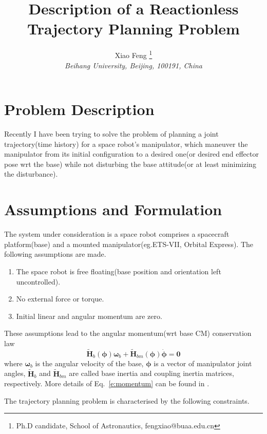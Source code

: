 \documentclass{article}
\title{Description of a Reactionless Trajectory Planning Problem}
\author{
	Xiao Feng
	\thanks{Ph.D candidate, School of Astronautics, fengxiao@buaa.edu.cn}\\
	{\normalsize\itshape
		Beihang University, Beijing, 100191, China}\\
}
\begin{document}
	\maketitle

\section{Problem Description}
Recently I have been trying to solve the problem of planning a joint trajectory(time history) for a space robot's manipulator, which maneuver the manipulator from its initial configuration to a desired one(or desired end effector pose wrt the base) while not disturbing the base attitude(or at least minimizing the disturbance).

\section{Assumptions and Formulation}
The system under consideration is a space robot comprises a spacecraft platform(base) and a mounted manipulator(eg.ETS-VII, Orbital Express). The following assumptions are made.

\begin{enumerate}
	\item The space robot is free floating(base position and orientation left uncontrolled).
	\item No external force or torque.
	\item Initial linear and angular momentum are zero.
\end{enumerate}

These assumptions lead to the angular momentum(wrt base CM) conservation law
\begin{equation}
\label{e:momentum}
\tilde{\bm{H}}_b(\bm{\phi})\bm{\omega}_b + \tilde{\bm{H}}_{bm}(\bm{\phi})\dot{\bm{\phi}} = \bm{0}
\end{equation} 
where $\bm{\omega}_b$ is the angular velocity of the base, $\bm{\phi}$ is a vector of manipulator joint angles, $\tilde{\bm{H}}_b$ and $\tilde{\bm{H}}_{bm}$ are called base inertia and coupling inertia
matrices, respectively. More details of Eq.~\ref{e:momentum} can be found in \cite{dimitrov2006dynamics}. 
 
The trajectory planning problem is characterised by the following constraints.
\end{document}
